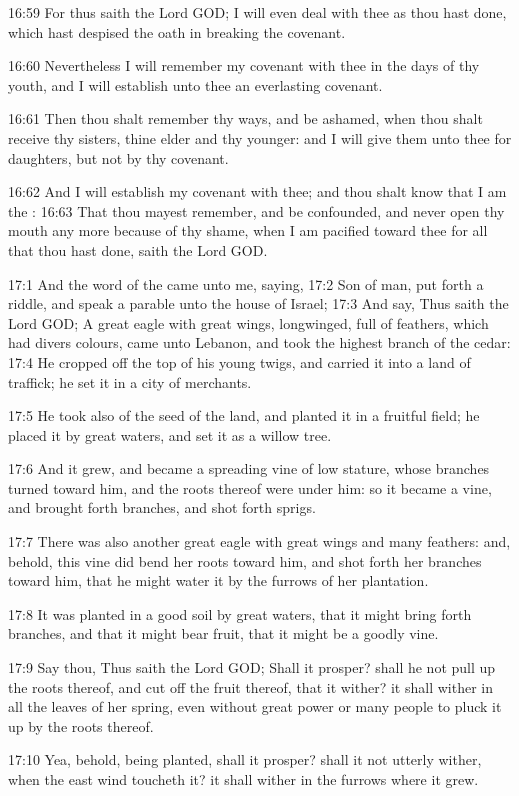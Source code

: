 16:59 For thus saith the Lord GOD; I will even deal with thee as thou
hast done, which hast despised the oath in breaking the covenant.

16:60 Nevertheless I will remember my covenant with thee in the days
of thy youth, and I will establish unto thee an everlasting covenant.

16:61 Then thou shalt remember thy ways, and be ashamed, when thou
shalt receive thy sisters, thine elder and thy younger: and I will
give them unto thee for daughters, but not by thy covenant.

16:62 And I will establish my covenant with thee; and thou shalt know
that I am the \LORD: 16:63 That thou mayest remember, and be
confounded, and never open thy mouth any more because of thy shame,
when I am pacified toward thee for all that thou hast done, saith the
Lord GOD.

17:1 And the word of the \LORD came unto me, saying, 17:2 Son of man,
put forth a riddle, and speak a parable unto the house of Israel; 17:3
And say, Thus saith the Lord GOD; A great eagle with great wings,
longwinged, full of feathers, which had divers colours, came unto
Lebanon, and took the highest branch of the cedar: 17:4 He cropped off
the top of his young twigs, and carried it into a land of traffick; he
set it in a city of merchants.

17:5 He took also of the seed of the land, and planted it in a
fruitful field; he placed it by great waters, and set it as a willow
tree.

17:6 And it grew, and became a spreading vine of low stature, whose
branches turned toward him, and the roots thereof were under him: so
it became a vine, and brought forth branches, and shot forth sprigs.

17:7 There was also another great eagle with great wings and many
feathers: and, behold, this vine did bend her roots toward him, and
shot forth her branches toward him, that he might water it by the
furrows of her plantation.

17:8 It was planted in a good soil by great waters, that it might
bring forth branches, and that it might bear fruit, that it might be a
goodly vine.

17:9 Say thou, Thus saith the Lord GOD; Shall it prosper? shall he not
pull up the roots thereof, and cut off the fruit thereof, that it
wither? it shall wither in all the leaves of her spring, even without
great power or many people to pluck it up by the roots thereof.

17:10 Yea, behold, being planted, shall it prosper? shall it not
utterly wither, when the east wind toucheth it? it shall wither in the
furrows where it grew.

